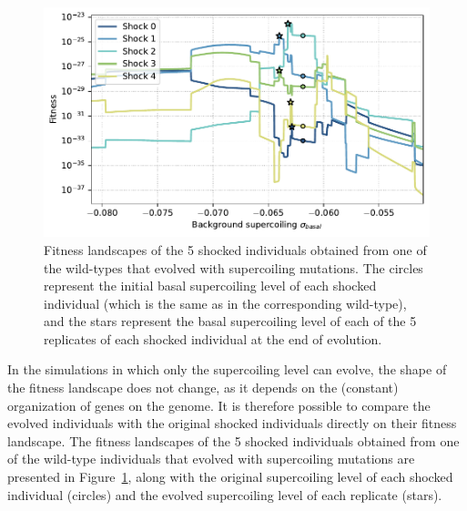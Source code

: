 \begin{figure}[H]
\centering
\includegraphics[width=\textwidth]{epistasis/img/with-sc/fitness_landscapes_wt_01_with_evolved.pdf}
\caption[Fitness landscapes with only supercoiling mutations]{Fitness landscapes of the 5 shocked individuals obtained from one of the wild-types that evolved with supercoiling mutations.
The circles represent the initial basal supercoiling level of each shocked individual (which is the same as in the corresponding wild-type), and the stars represent the basal supercoiling level of each of the 5 replicates of each shocked individual at the end of evolution.}
\label{fig:epistasis:sc-only-fitness-landscape}
\end{figure}

In the simulations in which only the supercoiling level can evolve, the shape of the fitness landscape does not change, as it depends on the (constant) organization of genes on the genome.
It is therefore possible to compare the evolved individuals with the original shocked individuals directly on their fitness landscape.
The fitness landscapes of the 5 shocked individuals obtained from one of the wild-type individuals that evolved with supercoiling mutations are presented in Figure~\ref{fig:epistasis:sc-only-fitness-landscape}, along with the original supercoiling level of each shocked individual (circles) and the evolved supercoiling level of each replicate (stars).

